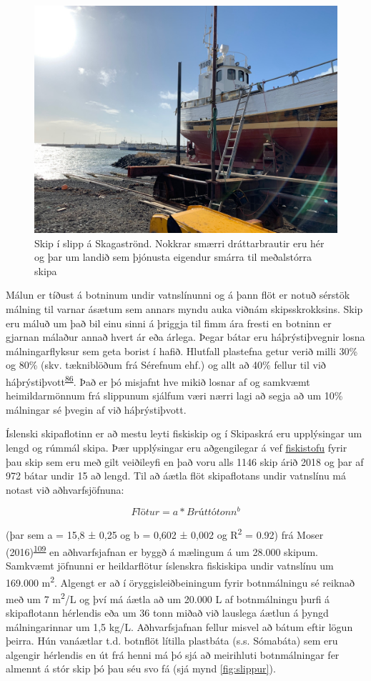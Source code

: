 \documentclass[icelandic,]{book}
\begin{document}
\begin{figure}

{\centering \includegraphics[width=0.6\linewidth]{myndir/slippur} 

}

\caption{Skip í slipp á Skagaströnd. Nokkrar smærri dráttarbrautir eru hér og þar um landið sem þjónusta eigendur smárra til meðalstórra skipa}\label{fig:Slippur}
\end{figure}

Málun er tíðust á botninum undir vatnslínunni og á þann flöt er notuð sérstök málning til varnar ásætum sem annars myndu auka viðnám skipsskrokksins. Skip eru máluð um það bil einu sinni á þriggja til fimm ára fresti en botninn er gjarnan málaður annað hvert ár eða árlega. Þegar bátar eru háþrýstiþvegnir losna málningarflyksur sem geta borist í hafið. Hlutfall plastefna getur verið milli 30\% og 80\% (skv. tækniblöðum frá Sérefnum ehf.) og allt að 40\% fellur til við háþrýstiþvott\textsuperscript{\protect\hyperlink{ref-Verschoor2016}{86}}. Það er þó misjafnt hve mikið losnar af og samkvæmt heimildarmönnum frá slippunum sjálfum væri nærri lagi að segja að um 10\% málningar sé þvegin af við háþrýstiþvott.

Íslenski skipaflotinn er að mestu leyti fiskiskip og í Skipaskrá eru upplýsingar um lengd og rúmmál skipa. Þær upplýsingar eru aðgengilegar á vef \href{http://www.fiskistofa.is/}{fiskistofu} fyrir þau skip sem eru með gilt veiðileyfi en það voru alls 1146 skip árið 2018 og þar af 972 bátar undir 15 að lengd. Til að áætla flöt skipaflotans undir vatnslínu má notast við aðhvarfsjöfnuna:

\begin{equation} 
  Flötur = a*Brúttótonn^b
  \label{eq:WSA}
\end{equation}

(þar sem a = 15,8 ± 0,25 og b = 0,602 ± 0,002 og R\textsuperscript{2} = 0.92) frá Moser (2016)\textsuperscript{\protect\hyperlink{ref-Moser2016}{109}} en aðhvarfsjafnan er byggð á mælingum á um 28.000 skipum. Samkvæmt jöfnunni er heildarflötur íslenskra fiskiskipa undir vatnslínu um 169.000 m\textsuperscript{2}. Algengt er að í öryggisleiðbeiningum fyrir botnmálningu sé reiknað með um 7 m\textsuperscript{2}/L og því má áætla að um 20.000 L af botnmálningu þurfi á skipaflotann hérlendis eða um 36 tonn miðað við lauslega áætlun á þyngd málningarinnar um 1,5 kg/L. Aðhvarfsjafnan fellur misvel að bátum eftir lögun þeirra. Hún vanáætlar t.d. botnflöt lítilla plastbáta (s.s. Sómabáta) sem eru algengir hérlendis en út frá henni má þó sjá að meirihluti botnmálningar fer almennt á stór skip þó þau séu svo fá (sjá mynd \ref{fig:slippur}).
\end{document}
